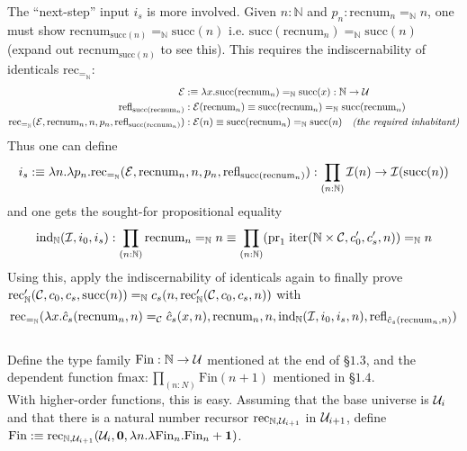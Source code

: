 The ``next-step'' input $i_{s}$ is more involved. Given $n : \mathbb{N}$ and $p_{n} : \text{recnum}_{n} =_{\mathbb{N}} n$, one must show $\text{recnum}_{\text{succ}(n)} =_{\mathbb{N}} \text{succ}(n)$ i.e. $\text{succ}(\text{recnum}_{n}) =_{\mathbb{N}} \text{succ}(n)$ (expand out $\text{recnum}_{\text{succ}(n)}$ to see this). This requires the indiscernability of identicals $\text{rec}_{=_{\mathbb{N}}}$:
\begin{align*}
	\mathcal{E} &:\equiv \lambda x.\text{succ}(\text{recnum}_{n}) =_{\mathbb{N}} \text{succ}(x) : \mathbb{N} \to \mathcal{U} \\
	\text{refl}_{\text{succ}(\text{recnum}_{n})} &: \mathcal{E}(\text{recnum}_{n}) \equiv \text{succ}(\text{recnum}_{n}) =_{\mathbb{N}} \text{succ}(\text{recnum}_{n}) \\
	\text{rec}_{=_{\mathbb{N}}}(\mathcal{E}, \text{recnum}_{n}, n, p_{n}, \text{refl}_{\text{succ}(\text{recnum}_{n})}) &: \mathcal{E}(n) \equiv \text{succ}(\text{recnum}_{n}) =_{\mathbb{N}} \text{succ}(n) \quad \textit{(the required inhabitant)}
\end{align*}
Thus one can define
\[
	i_{s} :\equiv \lambda n. \lambda p_{n}. \text{rec}_{=_{\mathbb{N}}}(\mathcal{E}, \text{recnum}_{n}, n, p_{n}, \text{refl}_{\text{succ}(\text{recnum}_{n})}) : \prod_{(n : \mathbb{N})} \mathcal{I}(n) \to \mathcal{I}(\text{succ}(n))
\]
and one gets the sought-for propositional equality
\[
	\text{ind}_{\mathbb{N}}(\mathcal{I}, i_{0}, i_{s}) : \prod_{(n : \mathbb{N})} \text{recnum}_{n} =_{\mathbb{N}} n \equiv \prod_{(n : \mathbb{N})}(\text{pr}_{1}\;\text{iter}(\mathbb{N} \times \mathcal{C}, c'_{0}, c'_{s}, n)) =_{\mathbb{N}} n
\]
Using this, apply the indiscernability of identicals again to finally prove $\text{rec}'_{\mathbb{N}}(\mathcal{C}, c_{0}, c_{s}, \text{succ}(n)) =_{\mathbb{N}} c_{s}(n,\text{rec}'_{\mathbb{N}}(\mathcal{C}, c_{0}, c_{s}, n))$ with
\[
	\text{rec}_{=_{\mathbb{N}}}(\lambda x. \hat{c}_{s}(\text{recnum}_{n},n) =_{\mathcal{C}} \hat{c}_{s}(x,n), \text{recnum}_{n}, n, \text{ind}_{\mathbb{N}}(\mathcal{I}, i_{0}, i_{s}, n), \text{refl}_{\hat{c}_{s}(\text{recnum}_{n},n)})
\] \\



 Define the type family $\text{Fin} : \mathbb{N} \to \mathcal{U}$ mentioned at the end of \S$1.3$, and the dependent function $\text{fmax} : \prod_{(n:N)}\text{Fin}(n + 1)$ mentioned in \S$1.4$. \\


 With higher-order functions, this is easy. Assuming that the base universe is $\mathcal{U}_{i}$ and that there is a natural number recursor $\text{rec}_{\mathbb{N}, \mathcal{U}_{i+1}}$ in $\mathcal{U}_{i+1}$, define $\text{Fin} :\equiv \text{rec}_{\mathbb{N}, \mathcal{U}_{i+1}}(\mathcal{U}_{i}, \textbf{0}, \lambda n. \lambda\text{Fin}_{n}. \text{Fin}_{n} + \textbf{1})$.

